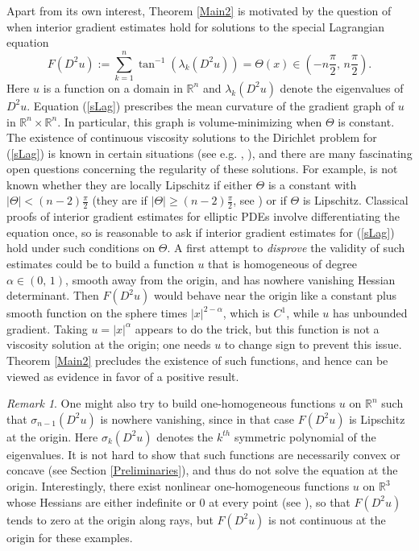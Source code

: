 \documentclass{amsart}
\theoremstyle{definition}
\theoremstyle{remark}
\newtheorem{rem}[thm]{Remark}
\begin{document}
Apart from its own interest, Theorem \ref{Main2} is motivated by the question of when interior gradient estimates hold for solutions to the special Lagrangian equation
\begin{equation}\label{sLag}
F(D^2u) := \sum_{k = 1}^n \tan^{-1}(\lambda_k(D^2u)) = \Theta(x) \in \left(-n\frac{\pi}{2},\, n\frac{\pi}{2}\right).
\end{equation}
Here $u$ is a function on a domain in $\mathbb{R}^n$ and $\lambda_k(D^2u)$ denote the eigenvalues of $D^2u$. Equation (\ref{sLag}) prescribes the mean curvature of the gradient graph of $u$ in $\mathbb{R}^n \times \mathbb{R}^n$. In particular, this graph is volume-minimizing when $\Theta$ is constant. 
The existence of continuous viscosity solutions to the Dirichlet problem for (\ref{sLag}) is known in certain situations (see e.g. \cite{HL}, \cite{CP}), and there are many fascinating open questions concerning the regularity of these solutions. For example, is not known whether they are locally Lipschitz if either $\Theta$ is a constant with $|\Theta| < (n-2)\frac{\pi}{2}$ (they are if $|\Theta| \geq (n-2)\frac{\pi}{2}$, see \cite{WY}) or if $\Theta$ is Lipschitz. Classical proofs of interior gradient estimates for elliptic PDEs involve differentiating the equation once, so is reasonable to ask if interior gradient estimates for (\ref{sLag}) hold under such conditions on $\Theta$.
A first attempt to {\it disprove} the validity of such estimates could be to build a function $u$ that is homogeneous of degree $\alpha \in (0,\,1)$, smooth away from the origin, and has nowhere vanishing Hessian determinant. Then $F(D^2u)$ would behave near the origin like a constant plus smooth function on the sphere times $|x|^{2-\alpha}$, which is $C^1$, while $u$ has unbounded gradient. Taking $u = |x|^{\alpha}$ appears to do the trick, but this function is not a viscosity solution at the origin; one needs $u$ to change sign to prevent this issue. Theorem \ref{Main2} precludes the existence of such functions, and hence can be viewed as evidence in favor of a positive result.

\begin{rem}
One might also try to build one-homogeneous functions $u$ on $\mathbb{R}^n$ such that $\sigma_{n-1}(D^2u)$ is nowhere vanishing, since in that case $F(D^2u)$ is Lipschitz at the origin. Here $\sigma_k(D^2u)$ denotes the $k^{th}$ symmetric polynomial of the eigenvalues. It is not hard to show that such functions are necessarily convex or concave (see Section \ref{Preliminaries}), and thus do not solve the equation at the origin. Interestingly, there exist nonlinear one-homogeneous functions $u$ on $\mathbb{R}^3$ whose Hessians are either indefinite or $0$ at every point (see \cite{M}), so that $F(D^2u)$ tends to zero at the origin along rays, but $F(D^2u)$ is not continuous at the origin for these examples.
\end{rem}
\end{document}
